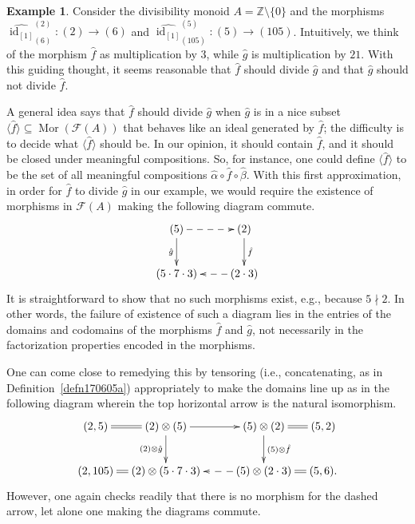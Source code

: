 \documentclass[reqno]{amsart}
\theoremstyle{plain}
\theoremstyle{definition}
\newtheorem{ex}[lem]{Example}
\newcommand{\cat}[1]{\mathcal{#1}}
\newcommand{\catf}{\cat{F}}
\newcommand{\id}{\operatorname{id}}
\newcommand{\bbz}{\mathbb{Z}}
\numberwithin{equation}{lem}
\begin{document}
\begin{ex}\label{ex170706azzz}
Consider the divisibility monoid $A=\bbz\setminus\{0\}$
and the morphisms 
$\widehat{\id_{[1]}}^{(2)}_{(6)}\colon(2)\to(6)$ and $\widehat{\id_{[1]}}^{(5)}_{(105)}\colon(5)\to(105)$.
Intuitively, we think of the morphism $\hat f$ as 
multiplication by 3, while $\hat g$ is multiplication by 
$21$.
With this guiding 
thought,
it seems reasonable that $\hat f$ 
should divide
$\hat g$ and that $\hat g$ should not divide $\hat f$.

A general idea says that 
$\hat f$ should divide $\hat g$ when
$\hat g$ is in 
a nice subset  $\langle\hat f\rangle\subseteq\operatorname{Mor}(\catf(A))$ that behaves like an
ideal generated by $\hat f$;
the 
difficulty
is to decide what $\langle\hat f\rangle$ should be.
In our opinion, it should contain $\hat f$, and it should be closed under meaningful compositions.
So, for instance, one could define  
$\langle\hat f\rangle$ to be the set of all meaningful compositions 
$\hat\alpha\circ\hat f\circ\hat\beta$.
With this first approximation, in order 
for $\hat f$ to divide $\hat g$
in our example, we would require the existence
of morphisms in $\catf(A)$ making the following diagram commute.
\begin{equation}
\label{eq170918a}
\begin{split}
\xymatrix{
(5)\ar@{-->}[r]\ar[d]_{\hat g}
&(2)\ar[d]^-{\hat f}
\\
(5\cdot 7\cdot 3)
&(2\cdot 3)\ar@{-->}[l]
}
\end{split}
\end{equation}
It is straightforward to show that no such morphisms exist, e.g., because $5\nmid 2$.
In other words, the failure of existence of such a diagram lies in the
entries of the domains and codomains of the morphisms $\hat f$ and $\hat g$, not necessarily in the 
factorization properties encoded in the morphisms.


One can
come close to remedying this by tensoring
(i.e., concatenating, as in Definition~\ref{defn170605a})
appropriately to make the domains line up
as in the following  diagram wherein the top horizontal arrow is  the natural isomorphism.
$$\xymatrix@C=1em{
(2,5)\ar@{=}[r]&(2)\otimes(5)\ar[rr]\ar[d]_{(2)\otimes\hat g}
&&(5)\otimes(2)\ar[d]^-{(5)\otimes\hat f}\ar@{=}[r]
&(5,2)
\\
(2,105)\ar@{=}[r]&(2)\otimes(5\cdot 7\cdot 3)
&&(5)\otimes(2\cdot 3)\ar@{-->}[ll]\ar@{=}[r]
&(5,6).
}
$$
However, one again checks readily that there is no morphism for the dashed arrow, let alone one making the 
diagrams
commute.


\end{ex}
\end{document}
